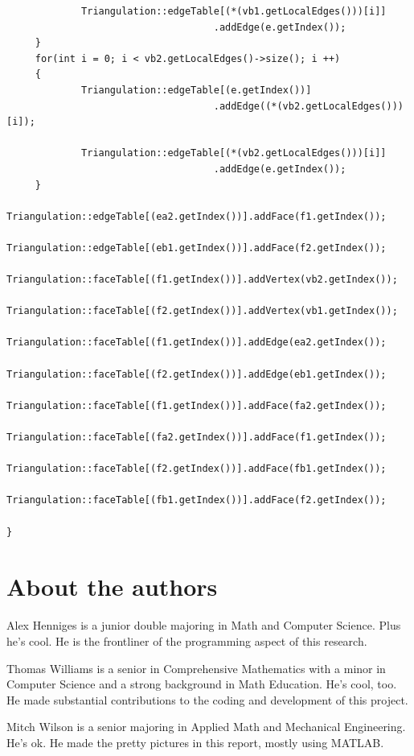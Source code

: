 \documentclass[12pt]{article}
\begin{document}
\begin{verbatim}
             Triangulation::edgeTable[(*(vb1.getLocalEdges()))[i]]
             						.addEdge(e.getIndex()); 
     }
     for(int i = 0; i < vb2.getLocalEdges()->size(); i ++)
     {
             Triangulation::edgeTable[(e.getIndex())]
             						.addEdge((*(vb2.getLocalEdges()))[i]); 
             						
             Triangulation::edgeTable[(*(vb2.getLocalEdges()))[i]]
             						.addEdge(e.getIndex()); 
     }
     Triangulation::edgeTable[(ea2.getIndex())].addFace(f1.getIndex()); 
     Triangulation::edgeTable[(eb1.getIndex())].addFace(f2.getIndex()); 
     Triangulation::faceTable[(f1.getIndex())].addVertex(vb2.getIndex());
     Triangulation::faceTable[(f2.getIndex())].addVertex(vb1.getIndex());
     Triangulation::faceTable[(f1.getIndex())].addEdge(ea2.getIndex());
     Triangulation::faceTable[(f2.getIndex())].addEdge(eb1.getIndex());
     Triangulation::faceTable[(f1.getIndex())].addFace(fa2.getIndex());
     Triangulation::faceTable[(fa2.getIndex())].addFace(f1.getIndex());
     Triangulation::faceTable[(f2.getIndex())].addFace(fb1.getIndex());
     Triangulation::faceTable[(fb1.getIndex())].addFace(f2.getIndex());
     
}
\end{verbatim}
\section*{About the authors}

Alex Henniges is a junior double majoring in Math and Computer Science. Plus he's cool. He is the frontliner of the programming aspect of this research. \newline
  
\noindent Thomas Williams is a senior in Comprehensive Mathematics with a minor in Computer Science and a strong background in Math Education. He's cool, too. He made substantial contributions to the coding and development of this project.\newline
  
\noindent Mitch Wilson is a senior majoring in Applied Math and Mechanical Engineering. He's ok. He made the pretty pictures in this report, mostly using MATLAB. 
\end{document}
